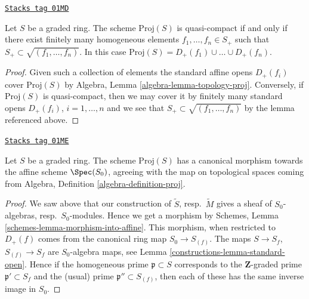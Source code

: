 \begin{lemma}
\label{constructions-lemma-proj-quasi-compact}
\href{https://stacks.math.columbia.edu/tag/01MD}{\texttt{Stacks tag 01MD}}

Let $S$ be a graded ring.
The scheme $\text{Proj}(S)$ is quasi-compact if and only
if there exist finitely many homogeneous elements
$f_1, \ldots, f_n \in S_{+}$ such that
$S_{+} \subset \sqrt{(f_1, \ldots, f_n)}$. In this case
$\text{Proj}(S) = D_+(f_1) \cup \ldots \cup D_+(f_n)$.
\end{lemma}

\begin{proof}
Given such a collection of elements the standard affine opens
$D_{+}(f_i)$ cover $\text{Proj}(S)$ by
Algebra, Lemma \ref{algebra-lemma-topology-proj}.
Conversely, if $\text{Proj}(S)$ is quasi-compact, then we
may cover it by finitely many standard opens
$D_{+}(f_i)$, $i = 1, \ldots, n$ and we see that
$S_{+} \subset \sqrt{(f_1, \ldots, f_n)}$ by the
lemma referenced above.
\end{proof}

\begin{lemma}
\label{constructions-lemma-structure-morphism-proj}
\href{https://stacks.math.columbia.edu/tag/01ME}{\texttt{Stacks tag 01ME}}

Let $S$ be a graded ring. The scheme $\text{Proj}(S)$ has a canonical morphism
towards the affine scheme $\Spec(S_0)$, agreeing with the map on
topological spaces coming from
Algebra, Definition \ref{algebra-definition-proj}.
\end{lemma}

\begin{proof}

We saw above that our construction of $\widetilde S$,
resp.\ $\widetilde M$ gives a sheaf of $S_0$-algebras, resp.\ $S_0$-modules.
Hence we get a morphism by
Schemes, Lemma \ref{schemes-lemma-morphism-into-affine}.
This morphism, when restricted to $D_{+}(f)$ comes from the
canonical ring map $S_0 \to S_{(f)}$. The maps
$S \to S_f$, $S_{(f)} \to S_f$ are $S_0$-algebra maps, see
Lemma \ref{constructions-lemma-standard-open}.
Hence if the homogeneous prime $\mathfrak p \subset S$
corresponds to the $\mathbf{Z}$-graded prime $\mathfrak p' \subset S_f$
and the (usual) prime $\mathfrak p'' \subset S_{(f)}$, then
each of these has the same inverse image in $S_0$.
\end{proof}

